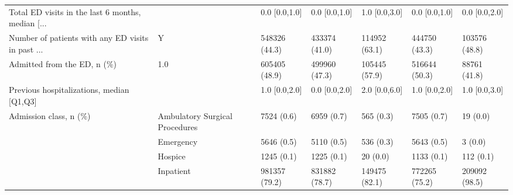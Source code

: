 \begin{tabular}{L{20em}C{10em}C{10em}C{10em}C{10em}C{10em}}
 Total ED visits in the last 6 months, median [... &                                    \hspace{3mm}  &      0.0 [0.0,1.0] &                           0.0 [0.0,1.0] &                       1.0 [0.0,3.0] &                            0.0 [0.0,1.0] &                       0.0 [0.0,2.0] \\
 Number of patients with any ED visits in past ... &                                   \hspace{3mm} Y &      548326 (44.3) &                           433374 (41.0) &                       114952 (63.1) &                            444750 (43.3) &                       103576 (48.8) \\
                       Admitted from the ED, n (\%) &                                 \hspace{3mm} 1.0 &      605405 (48.9) &                           499960 (47.3) &                       105445 (57.9) &                            516644 (50.3) &                        88761 (41.8) \\
         Previous hospitalizations, median [Q1,Q3] &                                    \hspace{3mm}  &      1.0 [0.0,2.0] &                           0.0 [0.0,2.0] &                       2.0 [0.0,6.0] &                            1.0 [0.0,2.0] &                       1.0 [0.0,3.0] \\
                            Admission class, n (\%) &      \hspace{3mm} Ambulatory Surgical Procedures &         7524 (0.6) &                              6959 (0.7) &                           565 (0.3) &                               7505 (0.7) &                            19 (0.0) \\
                                                   &                           \hspace{3mm} Emergency &         5646 (0.5) &                              5110 (0.5) &                           536 (0.3) &                               5643 (0.5) &                             3 (0.0) \\
                                                   &                             \hspace{3mm} Hospice &         1245 (0.1) &                              1225 (0.1) &                            20 (0.0) &                               1133 (0.1) &                           112 (0.1) \\
                                                   &                           \hspace{3mm} Inpatient &      981357 (79.2) &                           831882 (78.7) &                       149475 (82.1) &                            772265 (75.2) &                       209092 (98.5) \\

\end{tabular}
